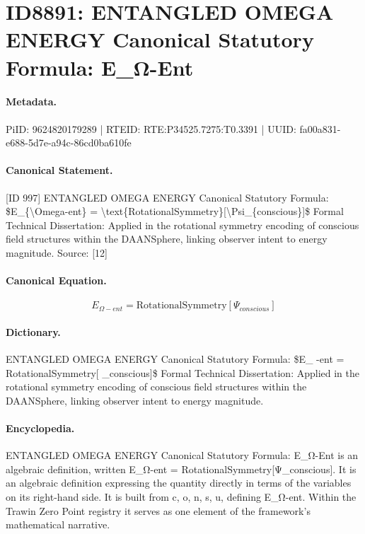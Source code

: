 \section*{ID8891: ENTANGLED OMEGA ENERGY Canonical Statutory Formula: E\_Ω-Ent}
\paragraph{Metadata.}
PiID: 9624820179289 | RTEID: RTE:P34525.7275:T0.3391 | UUID: fa00a831-e688-5d7e-a94c-86cd0ba610fe

\paragraph{Canonical Statement.}
[ID 997] ENTANGLED OMEGA ENERGY Canonical Statutory Formula: \$E\_\{\textbackslash{}Omega-ent\} = \textbackslash{}text\{RotationalSymmetry\}[\textbackslash{}Psi\_\{conscious\}]\$ Formal Technical Dissertation: Applied in the rotational symmetry encoding of conscious field structures within the DAANSphere, linking observer intent to energy magnitude. Source: [12]

\paragraph{Canonical Equation.}
\[
E_{\Omega-ent} = \text{RotationalSymmetry}[\Psi_{conscious}]
\]

\paragraph{Dictionary.}
ENTANGLED OMEGA ENERGY Canonical Statutory Formula: \$E\_ -ent = RotationalSymmetry[ \_conscious]\$ Formal Technical Dissertation: Applied in the rotational symmetry encoding of conscious field structures within the DAANSphere, linking observer intent to energy magnitude.

\paragraph{Encyclopedia.}
ENTANGLED OMEGA ENERGY Canonical Statutory Formula: E\_Ω-Ent is an algebraic definition, written E\_Ω-ent = RotationalSymmetry[Ψ\_conscious]. It is an algebraic definition expressing the quantity directly in terms of the variables on its right-hand side. It is built from c, o, n, s, u, defining E\_Ω-ent. Within the Trawin Zero Point registry it serves as one element of the framework's mathematical narrative.
